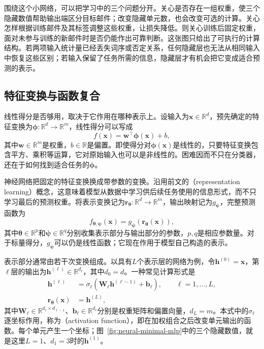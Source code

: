 围绕这个小网络，可以把学习中的三个问题分开。关心是否存在一组权重，使三个隐藏数值帮助输出端区分目标邮件；改变隐藏单元数，也会改变可选的计算。关心怎样根据训练邮件及其标签调整这些权重，让损失降低。则关心训练后固定权重，面对未参与训练的新邮件时是否仍能作出可靠判断。这张图只给出了可执行的计算结构。若两项输入统计量已经丢失词序或否定关系，任何隐藏层也无法从相同输入中恢复这些区别；若输入保留了任务所需的信息，隐藏层才有机会把它变成适合预测的表示。

\subsection{特征变换与函数复合}
\label{sec:neural-feature-composition}

线性得分是否够用，取决于它作用在哪种表示上。设输入为$\bm{x}\in\mathbb{R}^{d}$，预先确定的特征变换为$\bm{\phi}:\mathbb{R}^{d}\to\mathbb{R}^{m}$，线性得分可以写成
\begin{equation}
  f(\bm{x})=\bm{w}^{\top}\bm{\phi}(\bm{x})+b,
  \label{eq:neural-fixed-features}
\end{equation}
其中$\bm{w}\in\mathbb{R}^{m}$是权重，$b\in\mathbb{R}$是偏置。即使得分对$\bm{\phi}(\bm{x})$是线性的，只要特征变换包含平方、乘积等运算，它对原始输入也可以是非线性的。困难因而不只在分类器，还在于如何找到适合任务的$\bm{\phi}$。

神经网络把固定的特征变换换成带参数的变换。沿用前文的（representation learning）概念，这意味着模型从数据中学习供后续任务使用的信息形式，而不只学习最后的预测权重。将表示变换记为$\bm{r}_{\bm{\theta}}:\mathbb{R}^{d}\to\mathbb{R}^{m}$，输出映射记为$g_{\bm{\psi}}$，完整预测函数为
\begin{equation}
  f_{\bm{\theta},\bm{\psi}}(\bm{x})
  =g_{\bm{\psi}}\!\left(\bm{r}_{\bm{\theta}}(\bm{x})\right),
  \label{eq:neural-representation-readout}
\end{equation}
其中$\bm{\theta}\in\mathbb{R}^{p}$和$\bm{\psi}\in\mathbb{R}^{q}$分别收集表示部分与输出部分的参数，$p,q$是相应参数量。对于标量得分，$g_{\bm{\psi}}$可以仍是线性函数；它现在作用于模型自己构造的表示。

表示部分通常由若干次变换组成。以具有$L$个表示层的网络为例，令$\bm{h}^{(0)}=\bm{x}$，第$\ell$层的输出为$\bm{h}^{(\ell)}\in\mathbb{R}^{d_\ell}$，其中$d_0=d$。一种常见计算形式是
\begin{equation}
  \begin{aligned}
    \bm{h}^{(\ell)}
      &=\sigma_\ell\!\left(\bm{W}_\ell\bm{h}^{(\ell-1)}+\bm{b}_\ell\right),
      \qquad \ell=1,\ldots,L,\\
    \bm{r}_{\bm{\theta}}(\bm{x})&=\bm{h}^{(L)},
  \end{aligned}
  \label{eq:neural-layer-composition}
\end{equation}
其中$\bm{W}_\ell\in\mathbb{R}^{d_\ell\times d_{\ell-1}}$、$\bm{b}_\ell\in\mathbb{R}^{d_\ell}$分别是权重矩阵和偏置向量，$d_L=m$。本式中的$\sigma_\ell$逐坐标作用，称为（activation function），即在加权组合之后改变单元输出的函数。每个单元产生一个坐标；图~\ref{fig:neural-minimal-mlp}中的三个隐藏数值，就是这里$L=1$、$d_1=3$时的$\bm{h}^{(1)}$。

